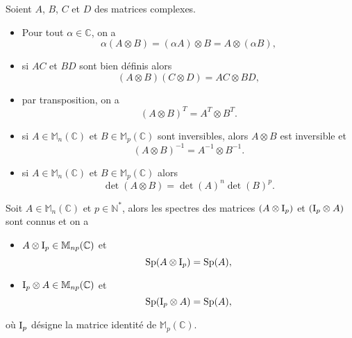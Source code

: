 \begin{proposition}
Soient $A$, $B$, $C$ et $D$ des matrices complexes.
\begin{itemize}
\item Pour tout $\alpha \in \mathbb{C}$, on a
\begin{equation}
\alpha ( A \otimes B ) = (\alpha A) \otimes B = A \otimes (\alpha B),
\end{equation}

\item si $AC$ et $BD$ sont bien définis alors
\begin{equation}
(A \otimes B ) (C \otimes D) = AC \otimes BD,
\end{equation} 

\item par transposition, on a
\begin{equation}
(A \otimes B)^{T} = A^{T} \otimes B^{T}.
\end{equation}

\item si $A \in \mathbb{M}_n (\mathbb{C})$ et $B \in \mathbb{M}_p (\mathbb{C})$ sont inversibles, alors $A \otimes B$ est inversible et
\begin{equation}
(A \otimes B)^{-1} = A^{-1} \otimes B^{-1}.
\end{equation}

\item si $A \in \mathbb{M}_n (\mathbb{C})$ et $B \in \mathbb{M}_p (\mathbb{C})$ alors
\begin{equation}
\det (A \otimes B) = \det(A)^n \det(B)^p.
\end{equation}
\end{itemize}
\label{prop:pdt_kron}
\end{proposition}

\begin{proposition}
Soit $A \in \mathbb{M}_n(\mathbb{C})$ et $p \in \mathbb{N}^*$, alors les spectres des matrices $(A \otimes \text{I}_p)$ et $(\text{I}_p \otimes A)$ sont connus et on a
\begin{itemize}
\item $A \otimes \text{I}_p \in \mathbb{M}_{np}(\mathbb{C})$ et
\begin{equation}
\text{Sp}(A \otimes \text{I}_p) = \text{Sp}(A),
\end{equation}

\item $\text{I}_p \otimes A \in \mathbb{M}_{np}(\mathbb{C})$ et
\begin{equation}
\text{Sp}(\text{I}_p \otimes A) = \text{Sp}(A),
\end{equation}
\end{itemize}
où $\text{I}_p$ désigne la matrice identité de $\mathbb{M}_p(\mathbb{C})$.
\label{prop:eigen_pdtkron}
\end{proposition}

